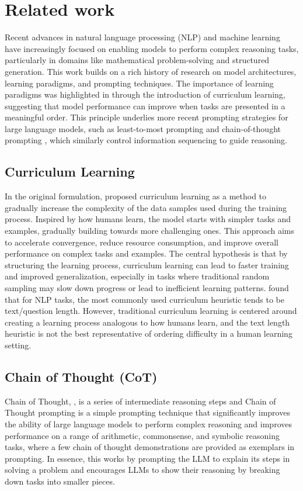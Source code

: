 \section{Related work}
Recent advances in natural language processing (NLP) and machine learning have increasingly focused on enabling models to perform complex reasoning tasks, particularly in domains like mathematical problem-solving and structured generation. This work builds on a rich history of research on model architectures, learning paradigms, and prompting techniques. The importance of learning paradigms was highlighted in \citet{Bengio2009CurriculumL} through the introduction of curriculum learning, suggesting that model performance can improve when tasks are presented in a meaningful order. This principle underlies more recent prompting strategies for large language models, such as least-to-most prompting \citet{zhou2023leasttomostpromptingenablescomplex} and chain-of-thought prompting \citet{wei2023chainofthoughtpromptingelicitsreasoning}, which similarly control information sequencing to guide reasoning.

\subsection{Curriculum Learning}
In the original formulation, \citet{Bengio2009CurriculumL} proposed curriculum learning as a method to gradually increase the complexity of the data samples used during the training process. Inspired by how humans learn, the model starts with simpler tasks and examples, gradually building towards more challenging ones. This approach aims to accelerate convergence, reduce resource consumption, and improve overall performance on complex tasks and examples. The central hypothesis is that by structuring the learning process, curriculum learning can lead to faster training and improved generalization, especially in tasks where traditional random sampling may slow down progress or lead to inefficient learning patterns. \citet{soviany2022curriculumlearningsurvey} found that for NLP tasks, the most commonly used curriculum heuristic tends to be text/question length. However, traditional curriculum learning is centered around creating a learning process analogous to how humans learn, and the text length heuristic is not the best representative of ordering difficulty in a human learning setting.

\subsection{Chain of Thought (CoT)}
Chain of Thought, \citet{wei2023chainofthoughtpromptingelicitsreasoning}, is a series of intermediate reasoning steps and Chain of Thought prompting is a simple prompting technique that significantly improves the ability of large language models to perform complex reasoning and improves performance on a range of arithmetic, commonsense, and symbolic reasoning tasks, where a few chain of thought demonstrations are provided as exemplars in prompting. In essence, this works by prompting the LLM to explain its steps in solving a problem and encourages LLMs to show their reasoning by breaking down tasks into smaller pieces.

